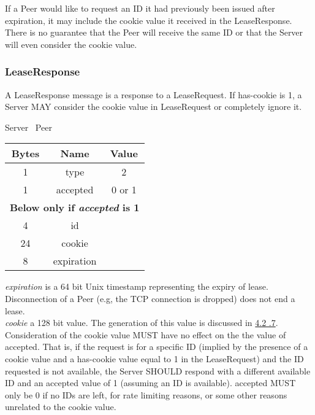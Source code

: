 If a Peer would like to request an ID it had previously been issued after expiration, it may include the cookie
value it received in the LeaseResponse. There is no guarantee that the Peer will receive the same ID or that the Server
will even consider the cookie value.

\subsubsection{LeaseResponse}

A LeaseResponse message is a response to a LeaseRequest. If has-cookie is 1, a Server MAY consider the cookie value
in LeaseRequest or completely
ignore it.

\begin{center}
    Server \textrightarrow\ Peer\\
    \begin{tabular}{|c|c|c|}
        \hline
        \textbf{Bytes} & \textbf{Name} & \textbf{Value} \\
        \hline
        1              & type          & 2              \\
        \hline
        1              & accepted      & 0 or 1         \\
        \hline
        \multicolumn{3}{|c|}{\textbf{Below only if \emph{accepted} is 1} } \\
        \hline
        4              & id            &                \\
        \hline
        24             & cookie        &                \\
        \hline
        8              & expiration    &                \\
        \hline
    \end{tabular}
\end{center}

\emph{expiration} is a 64 bit Unix timestamp representing the expiry of lease. Disconnection of a Peer (e.g,
the TCP connection is dropped) does not end a lease.\\

\emph{cookie} a 128 bit value. The generation of this value is discussed in \hyperlink{subsubsection.4.2.7}{4.2
.7}.\\

Consideration of the cookie value MUST have no effect on the the value of accepted. That is, if the
request is for a specific ID (implied by the presence of a cookie value and a has-cookie value equal to 1
in the LeaseRequest) and the ID requested is not available, the Server SHOULD respond with a different
available ID and an accepted value of 1 (assuming an ID is available). accepted MUST only be 0 if no IDs are left,
for rate limiting reasons, or some other reasons unrelated to the cookie value.

